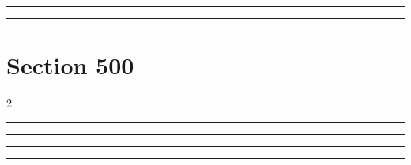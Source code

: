 \documentclass[11pt,a4paper]{article}
\begin{document}
\swarmwrapnext\lipsum[1]\lipsum[2]\lipsum[3]\lipsum[4]\lipsum[5]\lipsum[6]
\begin{swarmwrap}%
  \begin{minipage}[t]{4cm}
    \centering
    \textcolor{red!20}{\rule{\linewidth}{5cm}}
  \end{minipage}%
\end{swarmwrap}%
\swarmwrapnext\lipsum[1]
\begin{swarmwrap}%
  \begin{minipage}[t]{5cm}
    \centering
    \textcolor{red!20}{\rule{\linewidth}{6cm}}
  \end{minipage}%
\end{swarmwrap}%
\swarmwrapnext\lipsum[1]\lipsum[2]
\section{Section 500}
\begin{multicols}{2}
\begin{swarmwrap}%
  \begin{minipage}[t]{2cm}
    \centering
    \textcolor{blue!30}{\rule{\linewidth}{7cm}}
  \end{minipage}%
\end{swarmwrap}%
\swarmwrapnext\lipsum[1]\lipsum[2]
\end{multicols}
\begin{swarmwrap}%
  \begin{minipage}[t]{3cm}
    \centering
    \textcolor{red!20}{\rule{\linewidth}{8cm}}
  \end{minipage}%
\end{swarmwrap}%
\swarmwrapnext\lipsum[1]\lipsum[2]\lipsum[3]\lipsum[4]
\begin{swarmwrap}%
  \begin{minipage}[t]{4cm}
    \centering
    \textcolor{red!20}{\rule{\linewidth}{9cm}}
  \end{minipage}%
\end{swarmwrap}%
\swarmwrapnext\lipsum[1]\lipsum[2]\lipsum[3]\lipsum[4]\lipsum[5]
\begin{swarmwrap}%
  \begin{minipage}[t]{5cm}
    \centering
    \textcolor{red!20}{\rule{\linewidth}{10cm}}
  \end{minipage}%
\end{swarmwrap}%
\end{document}
